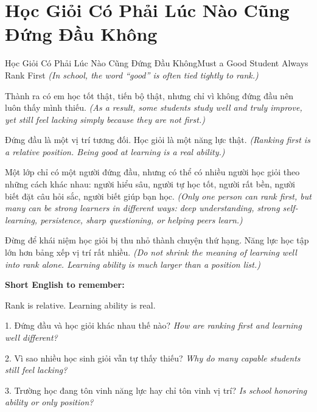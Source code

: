 \section{Học Giỏi Có Phải Lúc Nào Cũng Đứng Đầu Không}
\begin{truyen}{Học Giỏi Có Phải Lúc Nào Cũng Đứng Đầu Không}{Must a Good Student Always Rank First}
\textit{(In school, the word “good” is often tied tightly to rank.)}

Thành ra có em học tốt thật, tiến bộ thật, nhưng chỉ vì không đứng đầu nên luôn thấy mình thiếu.
\textit{(As a result, some students study well and truly improve, yet still feel lacking simply because they are not first.)}

Đứng đầu là một vị trí tương đối. Học giỏi là một năng lực thật.
\textit{(Ranking first is a relative position. Being good at learning is a real ability.)}

Một lớp chỉ có một người đứng đầu, nhưng có thể có nhiều người học giỏi theo những cách khác nhau: người hiểu sâu, người tự học tốt, người rất bền, người biết đặt câu hỏi sắc, người biết giúp bạn học.
\textit{(Only one person can rank first, but many can be strong learners in different ways: deep understanding, strong self-learning, persistence, sharp questioning, or helping peers learn.)}
\end{truyen}

\begin{baihoc}
Đừng để khái niệm học giỏi bị thu nhỏ thành chuyện thứ hạng. Năng lực học tập lớn hơn bảng xếp vị trí rất nhiều.
\textit{(Do not shrink the meaning of learning well into rank alone. Learning ability is much larger than a position list.)}
\end{baihoc}

\begin{ghinhoanh}
\textbf{Short English to remember:}

Rank is relative. Learning ability is real.

\end{ghinhoanh}

\begin{tuhocnhanh}
1. Đứng đầu và học giỏi khác nhau thế nào? \textit{How are ranking first and learning well different?}

2. Vì sao nhiều học sinh giỏi vẫn tự thấy thiếu? \textit{Why do many capable students still feel lacking?}

3. Trường học đang tôn vinh năng lực hay chỉ tôn vinh vị trí? \textit{Is school honoring ability or only position?}
\end{tuhocnhanh}
\ngancach

